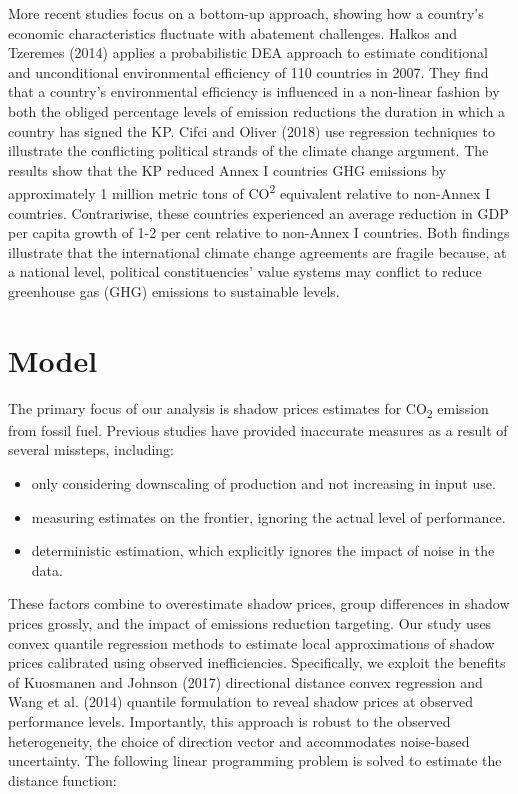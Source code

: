 \documentclass[
  10pt,
]{article}
\providecommand{\tightlist}{%
  \setlength{\itemsep}{0pt}\setlength{\parskip}{0pt}}
\begin{document}
More recent studies focus on a bottom-up approach, showing how a
country's economic characteristics fluctuate with abatement challenges.
Halkos and Tzeremes (2014) applies a probabilistic DEA approach to
estimate conditional and unconditional environmental efficiency of 110
countries in 2007. They find that a country's environmental efficiency
is influenced in a non-linear fashion by both the obliged percentage
levels of emission reductions the duration in which a country has signed
the KP. Cifci and Oliver (2018) use regression techniques to illustrate
the conflicting political strands of the climate change argument. The
results show that the KP reduced Annex I countries GHG emissions by
approximately 1 million metric tons of CO\textsuperscript{2} equivalent
relative to non-Annex I countries. Contrariwise, these countries
experienced an average reduction in GDP per capita growth of 1-2 per
cent relative to non-Annex I countries. Both findings illustrate that
the international climate change agreements are fragile because, at a
national level, political constituencies' value systems may conflict to
reduce greenhouse gas (GHG) emissions to sustainable levels.

\hypertarget{model}{%
\section{Model}\label{model}}

The primary focus of our analysis is shadow prices estimates for
CO\textsubscript{2} emission from fossil fuel. Previous studies have
provided inaccurate measures as a result of several missteps, including:

\begin{itemize}
\tightlist
\item
  only considering downscaling of production and not increasing in input
  use.
\item
  measuring estimates on the frontier, ignoring the actual level of
  performance.
\item
  deterministic estimation, which explicitly ignores the impact of noise
  in the data.
\end{itemize}

These factors combine to overestimate shadow prices, group differences
in shadow prices grossly, and the impact of emissions reduction
targeting. Our study uses convex quantile regression methods to estimate
local approximations of shadow prices calibrated using observed
inefficiencies. Specifically, we exploit the benefits of Kuosmanen and
Johnson (2017) directional distance convex regression and Wang et al.
(2014) quantile formulation to reveal shadow prices at observed
performance levels. Importantly, this approach is robust to the observed
heterogeneity, the choice of direction vector and accommodates
noise-based uncertainty. The following linear programming problem is
solved to estimate the distance function:
\end{document}
